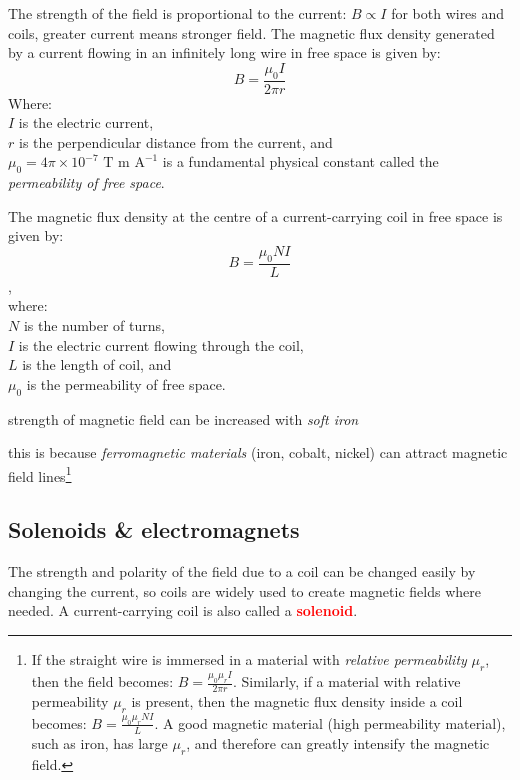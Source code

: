\documentclass[a4paper,12pt]{book}
\newcommand{\cmt}{}
\newcommand{\piste}{{\fontencoding{U}\fontfamily{futs}\selectfont\char 49\relax}}
\newcommand{\keypoint}[1]{\textbf{\textcolor{red}{#1}}}
\newcommand{\tcbhighmath}[1]{\boxed{#1}}
\newcommand{\piste}{\textsuperscript{$\star$}}
\newcommand{\keypoint}[1]{\textbf{\textcolor{red}{#1}}}
\newcommand{\cmt}{}
\begin{document}
The strength of the field is proportional to the current: $B \propto I$ for both wires and coils, greater current means stronger field. The magnetic flux density generated by a current flowing in an infinitely long wire in free space is given by: $$\tcbhighmath{B=\frac{\mu_0 I}{2\pi r}}$$
Where:\\
$I$ is the electric current,\\
$r$ is the perpendicular distance from the current, and \\
$\mu_0 = 4\pi \times 10^{-7} \text{ T m A}^{-1}$ is a fundamental physical constant called the \emph{permeability of free space}.

The magnetic flux density at the centre of a current-carrying coil in free space is given by: $$\tcbhighmath{B=\frac{\mu_0 NI}{L}}$$, \\
where:\\
$N$ is the number of turns,\\
$I$ is the electric current flowing through the coil, \\
$L$ is the length of coil, and \\
$\mu_0$ is the permeability of free space.
 
 
\cmt strength of magnetic field can be increased with \emph{soft iron}

this is because \emph{ferromagnetic materials} (iron, cobalt, nickel) can attract magnetic field lines\footnote{If the straight wire is immersed in a material with \emph{relative permeability} $\mu_r$, then the field becomes: $B=\frac{\mu_0 \mu_r I}{2\pi r}$. Similarly, if a material with relative permeability $\mu_r$ is present, then the magnetic flux density inside a coil becomes: $B=\frac{\mu_0 \mu_r NI}{L}$. A good magnetic material (high permeability material), such as iron, has large $\mu_r$, and therefore can greatly intensify the magnetic field. \piste}

\subsection{Solenoids \& electromagnets}

The strength and polarity of the field due to a coil can be changed easily by changing the current, so coils are widely used to create magnetic fields where needed. A current-carrying coil is also called a \keypoint{solenoid}.
\end{document}
